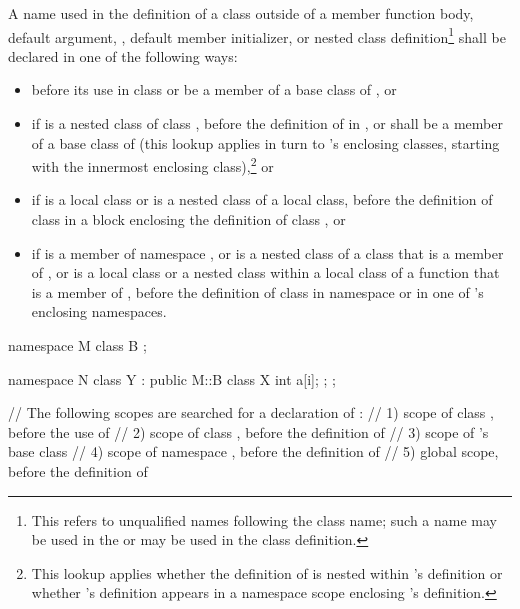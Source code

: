 \pnum
A name used in the definition of a class  outside of a member
function body, default argument, ,
default member initializer,
or nested class definition\footnote{This refers to unqualified names
following the class name; such a name may be used in the
 or may be used in the class definition.}
shall be declared in one of the following ways:
\begin{itemize}
\item before its use in class  or be a member of a base class
of , or
\item if  is a nested class of class
, before the definition of  in
, or shall be a member of a base class of  (this
lookup applies in turn to 's enclosing classes, starting with
the innermost enclosing class),\footnote{This lookup applies whether the
definition of  is
nested within 's definition or whether 's definition
appears in a namespace scope enclosing 's
definition.}
or
\item if  is a local class or is a nested
class of a local class, before the definition of class  in a
block enclosing the definition of class , or
\item if  is a member of namespace , or is a nested
class of a class that is a member of , or is a local class or a
nested class within a local class of a function that is a member of
, before the definition of class  in namespace
 or in one of 's enclosing namespaces.
\end{itemize}
\begin{example}
\begin{codeblock}
namespace M {
  class B { };
}

\end{codeblock}
\begin{codeblock}
namespace N {
  class Y : public M::B {
    class X {
      int a[i];
    };
  };
}

// The following scopes are searched for a declaration of :
// 1) scope of class , before the use of 
// 2) scope of class , before the definition of 
// 3) scope of 's base class 
// 4) scope of namespace , before the definition of 
// 5) global scope, before the definition of 
\end{codeblock}
\end{example}
